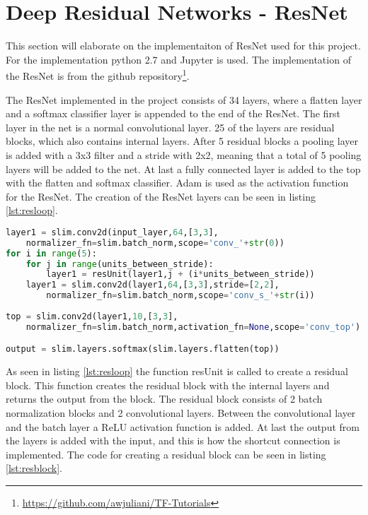 \section{Deep Residual Networks - ResNet}

This section will elaborate on the implementaiton of ResNet used for this project. For the implementation python 2.7 and Jupyter is used. The implementation of the ResNet is from the github repository\footnote{\url{https://github.com/awjuliani/TF-Tutorials}}. 

The ResNet implemented in the project consists of 34 layers, where a flatten layer and a softmax classifier layer is appended to the end of the ResNet. The first layer in the net is a normal convolutional layer. 25 of the layers are residual blocks, which also contains internal layers. After 5 residual blocks a pooling layer is added with a 3x3 filter and a stride with 2x2, meaning that a total of 5 pooling layers will be added to the net. At last a fully connected layer is added to the top with the flatten and softmax classifier. Adam is used as the activation function for the ResNet. The creation of the ResNet layers can be seen in listing \ref{lst:resloop}.

\begin{lstlisting}[language=Python, label=lst:resloop, caption=For loop that creates the layers in the ResNet]
layer1 = slim.conv2d(input_layer,64,[3,3],
	normalizer_fn=slim.batch_norm,scope='conv_'+str(0))
for i in range(5):
    for j in range(units_between_stride):
        layer1 = resUnit(layer1,j + (i*units_between_stride))
    layer1 = slim.conv2d(layer1,64,[3,3],stride=[2,2],
    	normalizer_fn=slim.batch_norm,scope='conv_s_'+str(i))
    
top = slim.conv2d(layer1,10,[3,3],
	normalizer_fn=slim.batch_norm,activation_fn=None,scope='conv_top')

output = slim.layers.softmax(slim.layers.flatten(top))
\end{lstlisting}

As seen in listing \ref{lst:resloop} the function resUnit is called to create a residual block. This function creates the residual block with the internal layers and returns the output from the block. The residual block consists of 2 batch normalization blocks and 2 convolutional layers. Between the convolutional layer and the batch layer a ReLU activation function is added. At last the output from the layers is added with the input, and this is how the shortcut connection is implemented. The code for creating a residual block can be seen in listing \ref{lst:resblock}.

